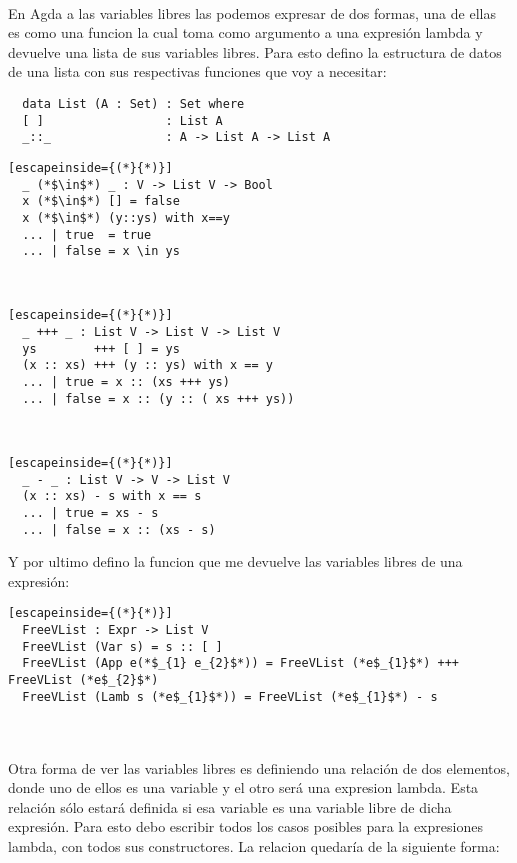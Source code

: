 \documentclass{book}
\begin{document}
\\

En Agda a las variables libres las podemos expresar de dos formas, una de ellas es como una funcion la cual toma como argumento a una expresión lambda y devuelve una lista de sus variables libres. Para esto defino la estructura de datos de una lista con sus respectivas funciones que voy a necesitar: \\

\begin{lstlisting}
  data List (A : Set) : Set where
  [ ]                 : List A
  _::_                : A -> List A -> List A
\end{lstlisting}
 

\begin{lstlisting}[escapeinside={(*}{*)}]
  _ (*$\in$*) _ : V -> List V -> Bool
  x (*$\in$*) [] = false
  x (*$\in$*) (y::ys) with x==y
  ... | true  = true
  ... | false = x \in ys
\end{lstlisting}
\\
\begin{lstlisting}[escapeinside={(*}{*)}]
  _ +++ _ : List V -> List V -> List V
  ys        +++ [ ] = ys
  (x :: xs) +++ (y :: ys) with x == y
  ... | true = x :: (xs +++ ys)
  ... | false = x :: (y :: ( xs +++ ys))
\end{lstlisting}
\\
\begin{lstlisting}[escapeinside={(*}{*)}]
  _ - _ : List V -> V -> List V
  (x :: xs) - s with x == s
  ... | true = xs - s
  ... | false = x :: (xs - s)
\end{lstlisting}

Y por ultimo defino la funcion que me devuelve las variables libres de una expresión: \\

\begin{lstlisting}[escapeinside={(*}{*)}]
  FreeVList : Expr -> List V
  FreeVList (Var s) = s :: [ ]
  FreeVList (App e(*$_{1} e_{2}$*)) = FreeVList (*e$_{1}$*) +++ FreeVList (*e$_{2}$*)
  FreeVList (Lamb s (*e$_{1}$*)) = FreeVList (*e$_{1}$*) - s
\end{lstlisting}
\\ \\

Otra forma de ver las variables libres es definiendo una relación de dos elementos, donde uno de ellos es una variable y el otro será una expresion lambda. Esta relación sólo estará definida si esa variable es una variable libre de dicha expresión.
Para esto debo escribir todos los casos posibles para la expresiones lambda, con todos sus constructores. La relacion quedaría de la siguiente forma: \\
\end{document}
